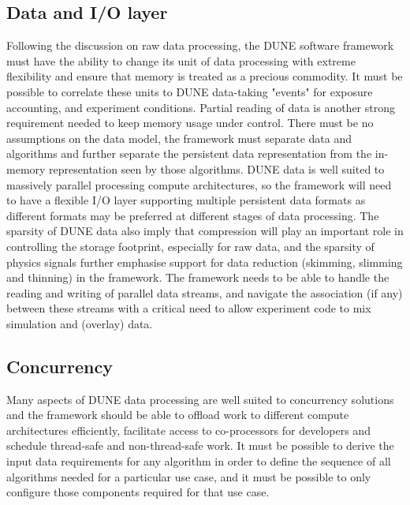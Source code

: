 \documentclass[../main-00.tex]{subfiles}
\begin{document}
\subsection{Data and I/O layer}
Following the discussion on raw data processing, the DUNE software framework must have the ability to change its unit of data processing with extreme flexibility and ensure that memory is treated as a precious commodity.  
It must be possible to correlate these units to DUNE data-taking "events" for exposure accounting, and experiment conditions.
Partial reading of data is another strong requirement needed to keep memory usage under control.  There must be no assumptions on the data model, the framework must separate data and algorithms and further separate the persistent data representation from the in-memory representation seen by those algorithms.  DUNE data is well suited to massively parallel processing compute architectures, so the framework will need to have a flexible I/O layer supporting multiple persistent data formats as different formats may be preferred at different stages of data processing.  The sparsity of DUNE data also imply that compression will play an important role in controlling the storage footprint, especially for raw data, and the sparsity of physics signals further emphasise support for data reduction (skimming, slimming and thinning) in the framework.  The framework needs to be able to handle the reading and writing of parallel data streams, and navigate the association (if any) between these streams with a critical need to allow experiment code to mix simulation and (overlay) data.

\subsection{Concurrency}
Many aspects of DUNE data processing are well suited to concurrency solutions and the framework should be able to offload work to different compute architectures efficiently, facilitate access to co-processors for developers and schedule thread-safe and non-thread-safe work.  It must be possible to derive the input data requirements for any algorithm in order to define the sequence of all algorithms needed for a particular use case, and it must be possible to only configure those components required for that use case.
\end{document}
